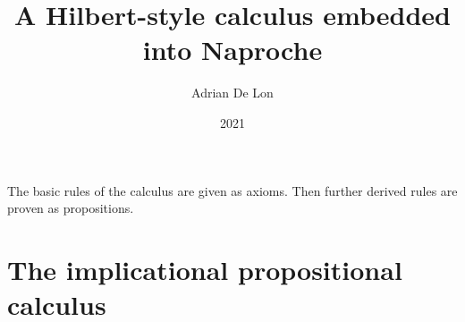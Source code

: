\documentclass{article}
\title{A Hilbert-style calculus embedded into Naproche}
\author{Adrian De Lon}
\date{2021}
\begin{document}

\maketitle

\begin{forthel}
\end{forthel}

The basic rules of the calculus are given as axioms.
Then further derived rules are proven as propositions. 

\section{The implicational propositional calculus}
\end{document}
